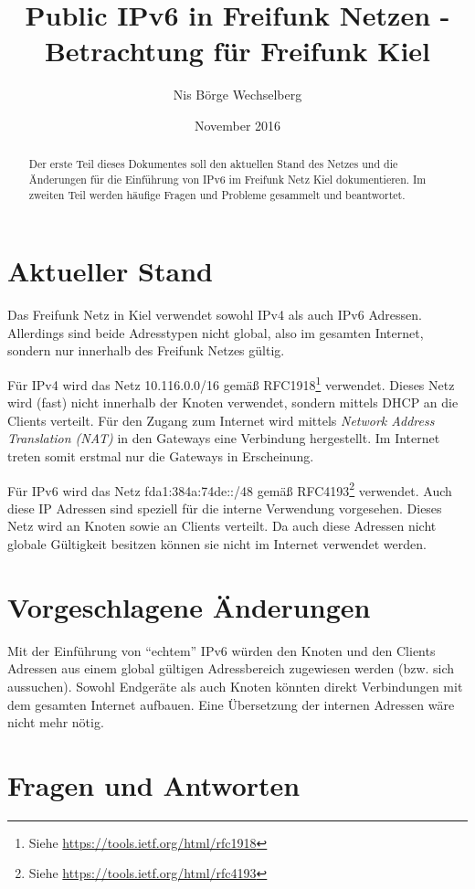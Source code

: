 \documentclass[10pt,a4paper,oneside]{scrartcl}
\title{Public IPv6 in Freifunk Netzen - Betrachtung für Freifunk Kiel}
\author{Nis Börge Wechselberg}
\date{November 2016}
\begin{document}
\maketitle

\begin{abstract}
Der erste Teil dieses Dokumentes soll den aktuellen Stand des Netzes
und die Änderungen für die Einführung von IPv6 im Freifunk Netz Kiel
dokumentieren. Im zweiten Teil werden häufige Fragen und Probleme gesammelt
und beantwortet.
\end{abstract}

\section{Aktueller Stand}
Das Freifunk Netz in Kiel verwendet sowohl IPv4 als auch IPv6 Adressen.
Allerdings sind beide Adresstypen nicht global, also im gesamten Internet,
sondern nur innerhalb des Freifunk Netzes gültig.

Für IPv4 wird das Netz 10.116.0.0/16 gemäß RFC1918\footnote{Siehe \url{https://tools.ietf.org/html/rfc1918}} verwendet.
Dieses Netz wird (fast) nicht innerhalb der Knoten verwendet, sondern mittels DHCP an die Clients verteilt.
Für den Zugang zum Internet wird mittels \emph{Network Address Translation (NAT)} in den Gateways eine Verbindung hergestellt.
Im Internet treten somit erstmal nur die Gateways in Erscheinung.

Für IPv6 wird das Netz fda1:384a:74de::/48 gemäß RFC4193\footnote{Siehe \url{https://tools.ietf.org/html/rfc4193}} verwendet.
Auch diese IP Adressen sind speziell für die interne Verwendung vorgesehen. Dieses Netz wird an Knoten sowie an Clients verteilt.
Da auch diese Adressen nicht globale Gültigkeit besitzen können sie nicht im Internet verwendet werden.

\section{Vorgeschlagene Änderungen}
Mit der Einführung von ``echtem'' IPv6 würden den Knoten und den Clients
Adressen aus einem global gültigen Adressbereich zugewiesen werden (bzw. sich aussuchen).
Sowohl Endgeräte als auch Knoten könnten direkt Verbindungen mit dem gesamten Internet aufbauen.
Eine Übersetzung der internen Adressen wäre nicht mehr nötig.

\section{Fragen und Antworten}
\end{document}
